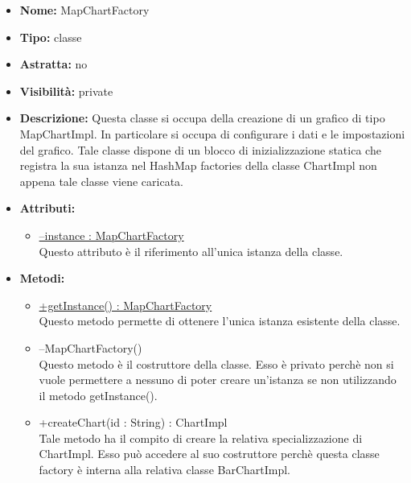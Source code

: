 			
			\begin{itemize}
			\item \textbf{Nome:} MapChartFactory
			\item \textbf{Tipo:} classe
			
		\item \textbf{Astratta:}
		no
			\item \textbf{Visibilità:} private
			\item \textbf{Descrizione:} Questa classe si occupa della creazione di un grafico di tipo MapChartImpl. In particolare si occupa di configurare i dati e le impostazioni del grafico. Tale classe dispone di un blocco di inizializzazione statica che registra la sua istanza nel HashMap factories della classe ChartImpl non appena tale classe viene caricata.
			\item \textbf{Attributi:}
				\begin{itemize}
				\setlength{\itemsep}{5pt}
				
					\item[\ding{111}] \underline{--instance : MapChartFactory} \\ [1mm] Questo attributo è il riferimento all'unica istanza della classe.
				\end{itemize}
		
			\item \textbf{Metodi:}
				\begin{itemize}
				\setlength{\itemsep}{5pt}
				
					\item[\ding{111}] {\underline{+getInstance() : MapChartFactory}} \\ [1mm] Questo metodo permette di ottenere l'unica istanza esistente della classe.
					\item[\ding{111}] {{--MapChartFactory()}} \\ [1mm] Questo metodo è il costruttore della classe. Esso è privato perchè non si vuole permettere a nessuno di poter creare un’istanza se non utilizzando il metodo getInstance().

					\item[\ding{111}] {{+createChart(id : String) : ChartImpl}} \\ [1mm] Tale metodo ha il compito di creare la relativa specializzazione di ChartImpl. Esso può accedere al suo costruttore perchè questa classe factory è interna alla relativa classe BarChartImpl.
				\end{itemize}
		
			\end{itemize}

